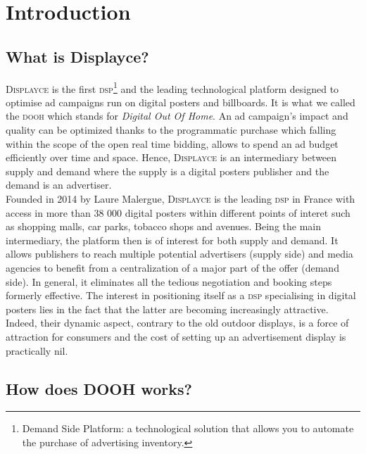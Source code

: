 \documentclass[12pt]{article}
\newcommand{\disp}{\textsc{Displayce}\xspace}
\begin{document}
\restoregeometry
{}
\normalsize
{}
\renewcommand{\contentsname}{Table of contents}
\tableofcontents
\newpage

\section{Introduction}

\subsection{What is Displayce?}

\disp is the first \textsc{dsp}\footnote{Demand Side Platform: a technological solution that allows you to automate the purchase of advertising inventory.} and the leading technological platform designed to optimise ad campaigns run on digital posters and billboards. It is what we called the \textsc{dooh} which stands for \emph{Digital Out Of Home}. An ad campaign's impact and quality can be optimized thanks to the programmatic purchase which falling within the scope of the open real time bidding, allows to spend an ad budget efficiently over time and space. Hence, \disp is an intermediary between supply and demand where the supply is a digital posters publisher and the demand is an advertiser. \\

Founded in 2014 by Laure Malergue, \disp is the leading \textsc{dsp} in France with access in more than 38 000 digital posters within different points of interet such as shopping malls, car parks, tobacco shops and avenues. Being the main intermediary, the platform then is of interest for both supply and demand. It allows publishers to reach multiple potential advertisers (supply side) and media agencies to benefit from a centralization of a major part of the offer (demand side). In general, it eliminates all the tedious negotiation and booking steps formerly effective. The interest in positioning itself as a \textsc{dsp} specialising in digital posters lies in the fact that the latter are becoming increasingly attractive. Indeed, their dynamic aspect, contrary to the old outdoor displays, is a force of attraction for consumers and the cost of setting up an advertisement display is practically nil. \\

\subsection{How does DOOH works?}
\end{document}
